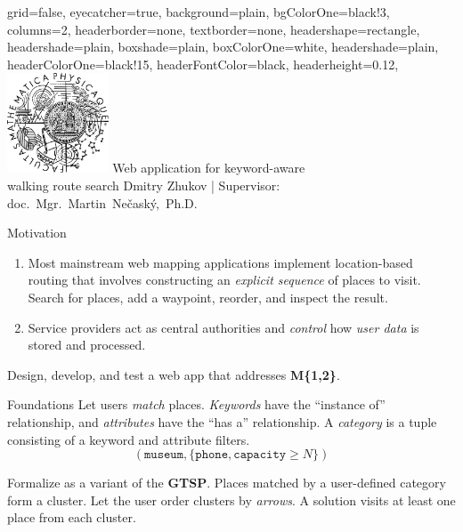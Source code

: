 \documentclass[portrait,a0paper,fontscale=0.25]{baposter}
\begin{document}
\color{black!80}
\begin{poster}{grid=false,
  eyecatcher=true,
  background=plain,
  bgColorOne=black!3,
  columns=2,
  headerborder=none,
  textborder=none,
  headershape=rectangle,
  headershade=plain,
  boxshade=plain,
  boxColorOne=white,
  headershade=plain,
  headerColorOne=black!15,
  headerFontColor=black,
  headerheight=0.12\textheight,
}%
{\includegraphics[height=8em]{./img/mff-black.pdf}}
{Web application for keyword-aware \\ walking route search}
{\vspace{0.5ex} Dmitry Zhukov | Supervisor: doc.~Mgr.~Martin~Nečaský,~Ph.D.}

%
%

\begin{posterbox}[column=0,name=motivation]{Motivation}
\begin{enumerate}[label=\textbf{M\arabic*}]
\item\label{itm:mot-routing} Most mainstream web mapping applications implement location-based routing that involves constructing an \emph{explicit sequence} of places to visit. Search for places, add a waypoint, reorder, and inspect the result.
\item\label{itm:mot-user-data} Service providers act as central authorities and \emph{control} how \emph{user data} is stored and processed.
\end{enumerate}
Design, develop, and test a web app that addresses \textbf{M\{1,2\}}.
\end{posterbox}

\begin{posterbox}[column=0, name=foundations, below=motivation, headerColorOne=cyan!60, boxColorOne=cyan!20]{Foundations}
Let users \emph{match} places. \emph{Keywords} have the ``instance of'' relationship, and \emph{attributes} have the ``has a'' relationship. A \emph{category} is a tuple consisting of a keyword and attribute filters.
\begin{equation*}
(\texttt{museum}, \{ \texttt{phone}, \texttt{capacity} \geq N \})
\end{equation*}

Formalize as a variant of the \textbf{GTSP}. Places matched by a user-defined category form a cluster. Let the user order clusters by \emph{arrows}. A solution visits at least one place from each cluster.


\end{posterbox}
\end{poster}
\end{document}
